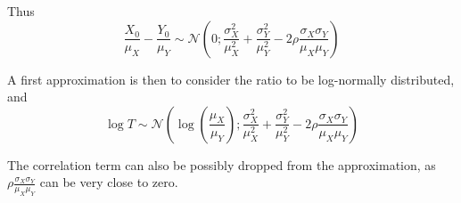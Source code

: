 \documentclass[../../Main_ManuscritThese.tex]{subfiles}
\begin{document}
  Thus
  \begin{equation}
    \frac{X_0}{\mu_X} - \frac{Y_0}{\mu_Y} \sim \mathcal{N}\left(0;\frac{\sigma^2_X}{\mu_X^2} + \frac{\sigma^2_Y}{\mu_Y^2} - 2 \rho \frac{\sigma_X \sigma_Y}{\mu_X \mu_Y} \right)
  \end{equation}
  
  A first approximation is then to consider the ratio to be log-normally distributed, and
  \begin{equation}
    \log T \sim \mathcal{N}\left(\log \left(\frac{\mu_X}{\mu_Y}\right); \frac{\sigma^2_X}{\mu_X^2} + \frac{\sigma^2_Y}{\mu_Y^2} - 2 \rho \frac{\sigma_X \sigma_Y}{\mu_X \mu_Y} \right)
  \end{equation}

  The correlation term can also be possibly dropped from the approximation,
  as $\rho \frac{\sigma_X \sigma_Y}{\mu_X \mu_Y}$ can be very close to
  zero.
  


\newpage
\end{document}
